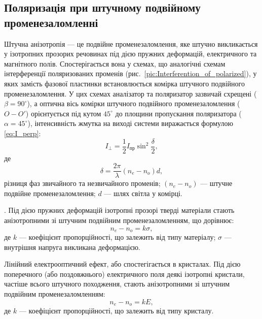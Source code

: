 \subsection*{Поляризація при штучному подвійному променезаломленні}


Штучна анізотропія --- це подвійне променезаломлення, яке штучно
викликається у ізотропних прозорих речовинах під дією пружних
деформацій, електричного та магнітного полів. Спостерігається вона у
схемах, що аналогічні схемам інтерференції поляризованих променів (рис.~\ref{pic:Interferention_of_polarized}), у яких замість фазової пластинки встановлюється комірка штучного
подвійного променезаломлення. У цих схемах аналізатор та поляризатор зазвичай
схрещені ($ \beta = 90^\circ $), а оптична вісь комірки штучного
подвійного променезаломлення ($ O - O' $) орієнтується під кутом $ 45^\circ $ до площини пропускання поляризатора ($ \alpha = 45^\circ $), інтенсивність жмутка на виході системи виражається
формулою \eqref{eq:I_perp}:
\begin{equation*}
    I_\perp = \frac12 I_\text{пр} \sin^2\frac\delta2,
\end{equation*}
де
\begin{equation*}
    \delta = \frac{2\pi}{\lambda} (n_e - n_o) d,
\end{equation*}
різниця фаз звичайного та незвичайного променів; $ (n_e - n_o) $ --- штучне
подвійне променезаломлення; $ d $ --- шлях світла у комірці.

\medskip

. Під дією пружних деформацій ізотропні
прозорі тверді матеріали стають анізотропними зі штучним
подвійним променезаломленням, що дорівнює:
\begin{equation}\label{eq:photoelasticity}
    n_e - n_o = k\sigma,
\end{equation}
де $ k $ --- коефіцієнт пропорційності, що залежить від типу матеріалу; $ \sigma $ --- внутрішня напруга викликана деформацією.

\medskip

Лінійний електрооптичний ефект, або  спостегігається в кристалах. Під дією поперечного (або поздовжнього)
електричного поля деякі ізотропні кристали, частіше всього штучного
походження, стають анізотропними зі штучним подвійним променезаломленням:
\begin{equation}\label{eq:kerr_effect}
    n_e - n_o = k E,
\end{equation}
де $k$ --- коефіцієнт пропорційності, що залежить від типу кристалу.

